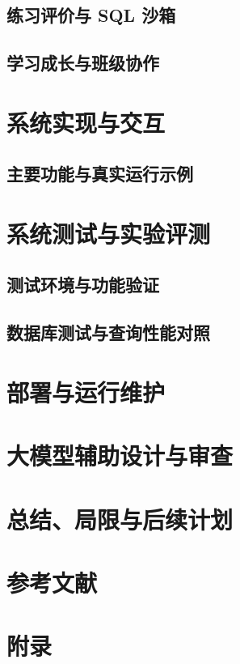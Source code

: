 \documentclass[12pt,hyperref,a4paper,UTF8]{ctexart}
\providecommand{\reference}{}
\begin{document}
\subsection{练习评价与 SQL 沙箱}

\subsection{学习成长与班级协作}


\section{系统实现与交互}

\subsection{主要功能与真实运行示例}


\section{系统测试与实验评测}

\subsection{测试环境与功能验证}

\subsection{数据库测试与查询性能对照}


\section{部署与运行维护}


\section{大模型辅助设计与审查}


\section{总结、局限与后续计划}

\section*{参考文献}
{}

\appendix
\section*{附录}
{}
\end{document}
